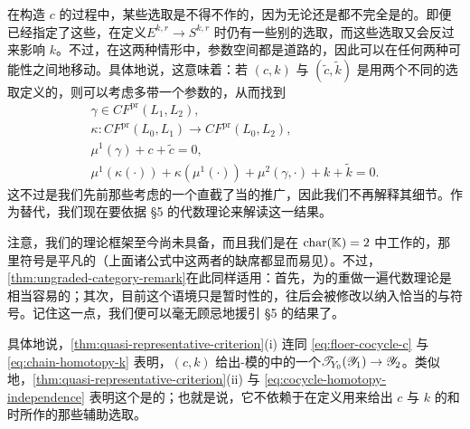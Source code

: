 在构造 $c$ 的过程中，某些选取是不得不作的，因为无论\trBoundaryCondition{}还是\trPerturbationDatum{}都不完全是\trCanonical{}的。即便已经指定了这些，在定义\trFamily{}$E^{k,r}\to S^{k,r}$ 时仍有一些别的选取，而这些选取又会反过来影响 $k$。不过，在这两种情形中，参数空间都是道路\trConnected{}的，因此可以在任何两种可能性之间\trSmooth{}地移动。具体地说，这意味着：若 $(c,k)$ 与 $(\tilde c,\tilde k)$ 是用两个不同的选取定义的，则可以考虑多带一个参数的\trModuliSpace，从而找到
\begin{equation}\label{eq:cocycle-homotopy-independence}
\boxed{\begin{gathered}
\gamma\in CF^{\mathrm{pr}}(L_1,L_2),\\
\kappa\colon CF^{\mathrm{pr}}(L_0,L_1)\longrightarrow CF^{\mathrm{pr}}(L_0,L_2),\\
\mu^1(\gamma)+c+\tilde{c}=0,\\
\mu^1(\kappa(\cdot))+\kappa(\mu^1(\cdot))+\mu^2(\gamma,\cdot)+k+\tilde{k}=0.
\end{gathered}}
\end{equation}
这不过是我们先前那些考虑的一个直截了当的推广，因此我们不再解释其细节。作为替代，我们现在要依据 §5 的代数理论来解读这一结果。
\begin{remark}\label{thm:gradings-signs-provisional}
注意，我们的\trFloer{}理论框架至今尚未具备\trGrading，而且我们是在 $\mathrm{char}(\mathbb{K})=2$ 中工作的，那里符号是平凡的（上面诸公式中这两者的缺席都显而易见）。不过，\cref{thm:ungraded-category-remark}在此同样适用：首先，为\trUngraded{}的\trACategory{}重做一遍代数理论是相当容易的；其次，目前这个语境只是暂时性的，往后会被修改以纳入恰当的\trGrading{}与符号。记住这一点，我们便可以毫无顾忌地援引 §5 的结果了。
\end{remark}
具体地说，\cref{thm:quasi-representative-criterion}(i) 连同 \eqref{eq:floer-cocycle-c} 与 \eqref{eq:chain-homotopy-k} 表明，$(c,k)$ 给出\trAinfty-模的\trCohomology\trCategory{}中的一个\trMorphism{}$\mathscr{T}_{Y_0}(\mathscr{Y}_1)\to\mathscr{Y}_2$。类似地，\cref{thm:quasi-representative-criterion}(ii) 与 \eqref{eq:cocycle-homotopy-independence} 表明这个\trMorphism{}是\trCanonical{}的；也就是说，它不依赖于在定义用来给出 $c$ 与 $k$ 的\trLefschetzFibration{}和\trModuliSpace{}时所作的那些辅助选取。
